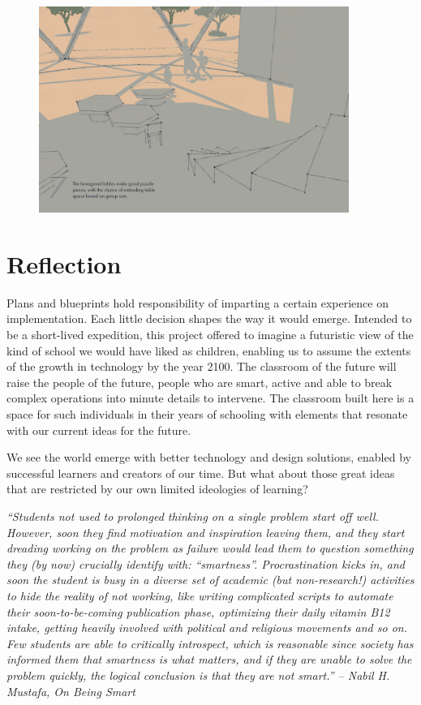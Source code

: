 \documentclass[a4paper,7pt]{article}
\begin{document}
\begin{figure}[h]
  \center
  \includegraphics[width=0.9\textwidth]{discoverdrome_7.png}
\end{figure}


\section{Reflection}
Plans and blueprints hold responsibility of imparting a certain experience on implementation. Each little decision shapes the way it would emerge. Intended to be a short-lived expedition, this project offered to imagine a futuristic view of the kind of school we would have liked as children, enabling us to assume the extents of the growth in technology by the year 2100. The classroom of the future will raise the people of the future, people who are smart, active and able to break complex operations into minute details to intervene. The classroom built here is a space for such individuals in their years of schooling with elements that resonate with our current ideas for the future.
 
We see the world emerge with better technology and design solutions, enabled by successful learners and creators of our time. But what about those great ideas that are restricted by our own limited ideologies of learning? 

\textit{“Students not used to prolonged thinking on a single problem start off well. However, soon they find motivation and inspiration leaving them, and they start dreading working on the problem as failure would lead them to question something they (by now) crucially identify with: “smartness”. Procrastination kicks in, and soon the student is busy in a diverse set of academic (but non-research!) activities to hide the reality of not working, like writing complicated scripts to automate their soon-to-be-coming publication phase, optimizing their daily vitamin B12 intake, getting heavily involved with political and religious movements and so on. Few students are able to critically introspect, which is reasonable since society has informed them that smartness is what matters, and if they are unable to solve the problem quickly, the logical conclusion is that they are not smart.” -- Nabil H. Mustafa, On Being Smart}
\end{document}
